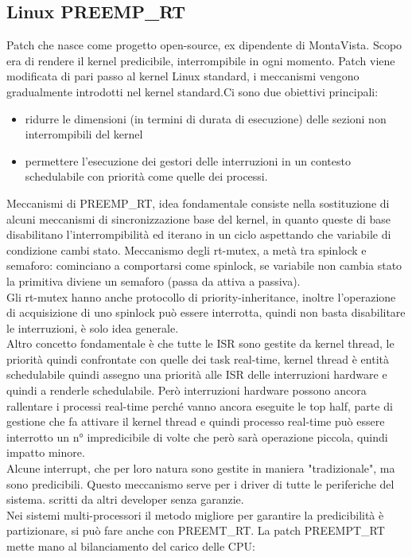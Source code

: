 \documentclass[12pt, oneside]{extbook}
\begin{document}
\subsection{Linux PREEMP\_RT}
Patch che nasce come progetto open-source, ex dipendente di MontaVista. Scopo era di rendere il kernel predicibile, interrompibile in ogni momento. Patch viene modificata di pari passo al kernel Linux standard, i meccanismi vengono gradualmente introdotti nel kernel standard.Ci sono due obiettivi principali:
\begin{itemize}
\item ridurre le dimensioni (in termini di durata di esecuzione) delle sezioni non interrompibili del kernel
\item permettere l'esecuzione dei gestori delle interruzioni in un contesto schedulabile con priorità come quelle dei processi.
\end{itemize}
Meccanismi di PREEMP\_RT, idea fondamentale consiste nella sostituzione di alcuni meccanismi di sincronizzazione base del kernel, in quanto queste di base disabilitano l'interrompibilità ed iterano in un ciclo aspettando che variabile di condizione cambi stato. Meccanismo degli rt-mutex, a metà tra spinlock e semaforo: cominciano a comportarsi come spinlock, se variabile non cambia stato la primitiva diviene un semaforo (passa da attiva a passiva).\\ Gli rt-mutex hanno anche protocollo di priority-inheritance, inoltre l'operazione di acquisizione di uno spinlock può essere interrotta, quindi non basta disabilitare le interruzioni, è solo idea generale.\\ Altro concetto fondamentale è che tutte le ISR sono gestite da kernel thread, le priorità quindi confrontate con quelle dei task real-time, kernel thread è entità schedulabile quindi assegno una priorità alle ISR delle interruzioni hardware e quindi a renderle schedulabile. Però interruzioni hardware possono ancora rallentare i processi real-time perché vanno ancora eseguite le top half, parte di gestione che fa attivare il kernel thread e quindi processo real-time può essere interrotto un n° impredicibile di volte che però sarà operazione piccola, quindi impatto minore.\\ Alcune interrupt, che per loro natura sono gestite in maniera "tradizionale", ma sono predicibili. Questo meccanismo serve per i driver di tutte le periferiche del sistema. scritti da altri developer senza garanzie.\\ Nei sistemi multi-processori il metodo migliore per garantire la predicibilità è partizionare, si può fare anche con PREEMT\_RT. La patch PREEMPT\_RT mette mano al bilanciamento del carico delle CPU:
\end{document}
